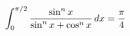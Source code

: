 \documentclass[preview]{standalone}
\begin{document}
\begin{align*}
\special{dvisvgm:raw <g id='unique000'>}\int_0^{\pi/2} \frac{\sin^n x}{\sin^n x + \cos^n x}\,dx = \frac{\pi}{4}\special{dvisvgm:raw </g>}
\end{align*}
\end{document}
